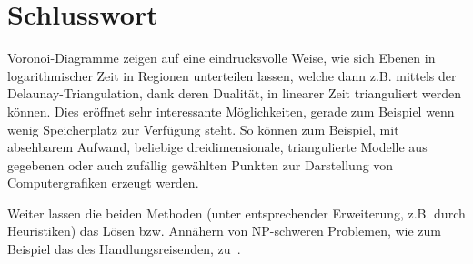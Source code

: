 \section{Schlusswort}
Voronoi-Diagramme zeigen auf eine eindrucksvolle Weise, wie sich Ebenen in logarithmischer Zeit in Regionen unterteilen lassen, welche dann z.B. mittels der Delaunay-Triangulation, dank deren Dualität, in linearer Zeit trianguliert werden können. Dies eröffnet sehr interessante Möglichkeiten, gerade zum Beispiel wenn wenig Speicherplatz zur Verfügung steht. So können zum Beispiel, mit absehbarem Aufwand, beliebige dreidimensionale, triangulierte Modelle aus gegebenen oder auch zufällig gewählten Punkten zur Darstellung von Computergrafiken erzeugt werden.

Weiter lassen die beiden Methoden (unter entsprechender Erweiterung, z.B. durch Heuristiken) das Lösen bzw. Annähern von NP-schweren Problemen, wie zum Beispiel das des Handlungsreisenden, zu~\parencite{schmitting2007}.
